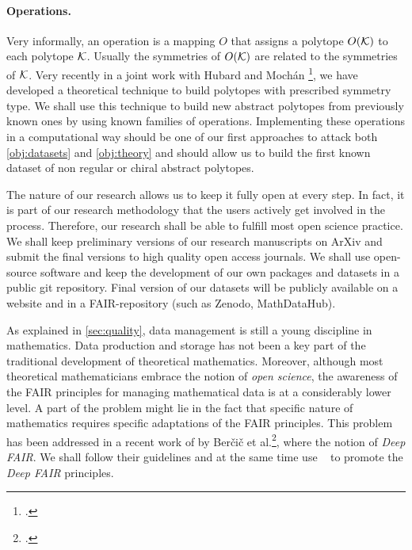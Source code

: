 \paragraph{Operations. } Very informally, an operation is a mapping $O$ that assigns a polytope $O(\mathcal{K})$ to each polytope $\mathcal{K}$. Usually the symmetries of $O(\mathcal{K})$ are related to the symmetries of $\mathcal{K}$. Very recently in a joint work with Hubard and Mochán
\footcite{HubardMochanMontero__VoltageOperationsManiplexes_preprint}, we have developed a theoretical technique %
to build polytopes with prescribed symmetry type.
We shall use this technique to build new abstract polytopes from previously known ones by using known families of operations.
Implementing these operations in a computational way should be one of our first approaches to attack both \cref{obj:datasets} and \cref{obj:theory} and should allow us to build the first known dataset of non regular or chiral abstract polytopes.


{}
The nature of our research allows us to keep it fully open at every step.
In fact, it is part of our research methodology that the users actively get involved in the process.
Therefore, our research shall be able to fulfill most open science practice.
We shall keep preliminary versions of our research manuscripts on ArXiv and submit the final versions to high quality open access journals.
We shall use open-source software and keep the development of our own packages and datasets in a public git repository.
Final version of our datasets will be publicly available on a website and in a FAIR-repository (such as Zenodo, MathDataHub).

As explained in \cref{sec:quality}, data management is still a young discipline in mathematics.
Data production and storage has not been a key part of the traditional development of theoretical mathematics.
Moreover, although most theoretical mathematicians embrace the notion of \emph{open science}, the awareness of %
 the %
 FAIR principles for managing mathematical data is at a considerably lower level.
 A part of the problem might lie in the fact that specific nature of mathematics requires specific adaptations of the FAIR principles.
This problem has been addressed in a recent work of  by Berčič et al.\footcite{BercicKohlhaseRabe_2020_DeepFairMathematics},
where the notion of \emph{Deep FAIR}.
We shall follow their guidelines and at the same time use \ourp\  %
to promote the \emph{Deep FAIR} principles.

